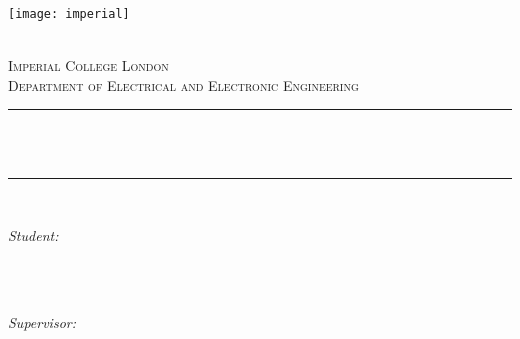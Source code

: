 \begin{titlepage}

\newcommand{\HRule}{\rule{\linewidth}{0.5mm}} %


\texttt{[image: imperial]} %


\center %

\quad\\[1.5cm]
\textsc{\Large Imperial College London}\\[0.5cm] %
\textsc{\large Department of Electrical and Electronic Engineering}\\[2cm] %

\makeatletter
\HRule \\[0.5cm]
{ \LARGE \textbf{\projectup}} \\[0.3cm]
{ \LARGE \textbf{\projectdown}} 
\HRule \\[2cm]


\begin{minipage}[t]{0.4\textwidth}
\flushleft
\large
\emph{Student:}\\
\student\\
\end{minipage}
~
\begin{minipage}[t]{0.4\textwidth}
\flushright
\large
\emph{Supervisor:} \\
\supervisor %
\end{minipage}\\[3cm]
~
\makeatother


\end{titlepage}
